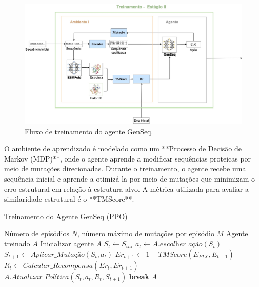 \begin{figure}[H]
    \centering
    \includegraphics[width=.8\textwidth]{figuras/metodologia-Training.jpg}
    \caption{Fluxo de treinamento do agente GenSeq.}
    \label{fig:training}
\end{figure}

O ambiente de aprendizado é modelado como um **Processo de Decisão de Markov (MDP)**,
 onde o agente aprende a modificar sequências proteicas por meio de mutações direcionadas.
  Durante o treinamento, o agente recebe uma sequência inicial e aprende a otimizá-la por meio 
  de mutações que minimizam o erro estrutural em relação à estrutura alvo. A
   métrica utilizada para avaliar a similaridade estrutural é o **TMScore**.

\begin{algorithm}
    \caption{Treinamento do Agente GenSeq (PPO)}
    \label{alg:train_agent}
    \begin{algorithmic}[1]
    \Require Número de episódios $N$, número máximo de mutações por episódio $M$
    \Ensure Agente treinado $A$
    \State Inicializar agente $A$
        \State $S_{t} \gets S_{ini}$  
            \State $a_{t} \gets A.\textit{escolher\_ação}(S_{t})$  
            \State $S_{t+1} \gets \textit{Aplicar\_Mutação}(S_{t}, a_{t})$
            \State $Er_{t+1} \gets 1 - \textit{TMScore}(E_{FIX}, E_{t+1})$
            \State $R_{t} \gets \textit{Calcular\_Recompensa}(Er_{t}, Er_{t+1})$
            \State $A.\textit{Atualizar\_Política}(S_{t}, a_{t}, R_{t}, S_{t+1})$
                \State \textbf{break}
            \EndIf
        \EndFor
    \EndFor
    \Return $A$
    \end{algorithmic}
\end{algorithm}


